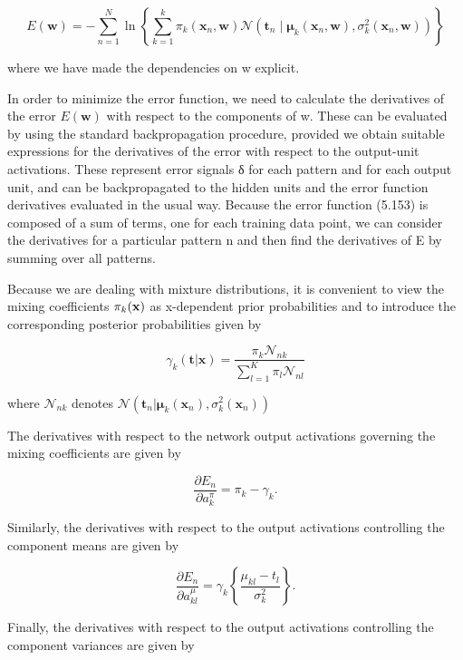 \documentclass[
  10
]{article}
\begin{document}
\[
E (\mathbf {w}) = - \sum_ {n = 1} ^ {N} \ln \left\{\sum_ {k = 1} ^ {k} \pi_ {k} \left(\mathbf {x} _ {n}, \mathbf {w}\right) \mathcal {N} \left(\mathbf {t} _ {n} \mid \boldsymbol {\mu} _ {k} \left(\mathbf {x} _ {n}, \mathbf {w}\right), \sigma_ {k} ^ {2} \left(\mathbf {x} _ {n}, \mathbf {w}\right)\right) \right\}\tag{5.153}
\]

where we have made the dependencies on w explicit.

In order to minimize the error function, we need to calculate the
derivatives of the error \(E ( \mathbf { w } )\) with respect to the
components of w. These can be evaluated by using the standard
backpropagation procedure, provided we obtain suitable expressions for
the derivatives of the error with respect to the output-unit
activations. These represent error signals δ for each pattern and for
each output unit, and can be backpropagated to the hidden units and the
error function derivatives evaluated in the usual way. Because the error
function (5.153) is composed of a sum of terms, one for each training
data point, we can consider the derivatives for a particular pattern n
and then find the derivatives of E by summing over all patterns.

Because we are dealing with mixture distributions, it is convenient to
view the mixing coefficients \(\pi _ { k } ( { \bf x } )\) as
x-dependent prior probabilities and to introduce the corresponding
posterior probabilities given by

\[
\gamma_ {k} (\mathbf {t} | \mathbf {x}) = \frac {\pi_ {k} \mathcal {N} _ {n k}}{\sum_ {l = 1} ^ {K} \pi_ {l} \mathcal {N} _ {n l}}\tag{5.154}
\]

where \(\mathcal { N } _ { n k }\) denotes
\(\mathcal { N } \left( \mathbf { t } _ { n } | \pmb { \mu } _ { k } ( \mathbf { x } _ { n } ) , \sigma _ { k } ^ { 2 } ( \mathbf { x } _ { n } ) \right)\)

The derivatives with respect to the network output activations governing
the mixing coefficients are given by

\[
\frac {\partial E _ {n}}{\partial a _ {k} ^ {\pi}} = \pi_ {k} - \gamma_ {k}.\tag{5.155}
\]

Similarly, the derivatives with respect to the output activations
controlling the component means are given by

\[
\frac {\partial E _ {n}}{\partial a _ {k l} ^ {\mu}} = \gamma_ {k} \left\{\frac {\mu_ {k l} - t _ {l}}{\sigma_ {k} ^ {2}} \right\}.\tag{5.156}
\]

Finally, the derivatives with respect to the output activations
controlling the component variances are given by
\end{document}
